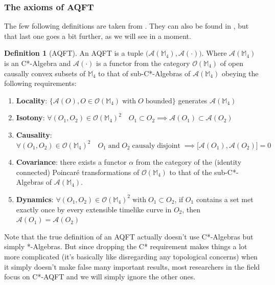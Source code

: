 \documentclass[a4paper,11pt]{article}
\numberwithin{equation}{section}
\theoremstyle{definition}
\newtheorem{definition}{Definition}
\begin{document}
\subsubsection{The axioms of AQFT}
The few following definitions are taken from \cite{AQFT_Intro}. They can also be found in \cite{pAQFT}, but that last one goes a bit further, as we will see in a moment.
\begin{definition}[AQFT]
    An AQFT is a tuple $\big(\mathcal{A}(\mathbb{M}_4), \mathcal{A}(\cdot)\big)$. Where $\mathcal{A}(\mathbb{M}_4)$ is an C*-Algebra and $\mathcal{A}(\cdot)$ is a functor from the category $\mathcal{O}(\mathbb{M}_4)$ of open causally convex subsets of $\mathbb{M}_4$ to that of sub-C*-Algebras of $\mathcal{A}(\mathbb{M}_4)$ obeying the following requirements:
    \begin{enumerate}
        \item \textbf{Locality}:  $\big\{\mathcal{A}(O), O \in \mathcal{O}(\mathbb{M}_4) \; \mathrm{with}\; O\; \mathrm{bounded}\big\}$ generates $\mathcal{A}(\mathbb{M}_4)$
        \item \textbf{Isotony}: $\forall (O_1, O_2) \in \mathcal{O}(\mathbb{M}_4)^2 \quad O_1\subset O_2 \implies \mathcal{A}(O_1)\subset\mathcal{A}(O_2)$
        \item \textbf{Causality}: $\forall (O_1, O_2) \in \mathcal{O}(\mathbb{M}_4)^2 \quad O_1 \; \mathrm{and}\; O_2\; \mathrm{causaly}\;\mathrm{disjoint}\; \implies \big[\mathcal{A}(O_1),\mathcal{A}(O_2)\big]=0$
        \item \textbf{Covariance}: there exists a functor $\alpha$ from the category of the (identity connected) Poincaré transformations of $\mathcal{O}(\mathbb{M}_4)$ to that of the sub-C*-Algebras of $\mathcal{A}(\mathbb{M}_4)$.
        \item \textbf{Dynamics}: $\forall (O_1, O_2) \in \mathcal{O}(\mathbb{M}_4)^2 \;\mathrm{with} \;O_1 \subset O_2$, if $O_1$ contains a set met exactly once by every extensible timelike curve in $O_2$, then $\mathcal{A}(O_1)=\mathcal{A}(O_2)$
    \end{enumerate}
Note that the true definition of an AQFT actually doesn't use C*-Algebras but simply *-Algebras. But since dropping the C* requirement makes things a lot more complicated (it's basically like disregarding any topological concerns) when it simply doesn't make false many important results, most researchers in the field focus on C*-AQFT and we will simply ignore the other ones.
\end{definition}
\end{document}
